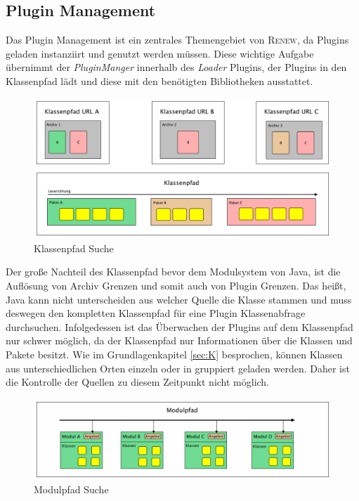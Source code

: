 	\subsection{Plugin Management} \label{sub:plugin_managment}
		Das Plugin Management ist ein zentrales Themengebiet von \textsc{Renew}, da Plugins geladen instanziirt und genutzt werden müssen. Diese wichtige Aufgabe übernimmt der \textit{PluginManger} innerhalb des \textit{Loader} Plugins, der Plugins in den Klassenpfad lädt und diese mit den benötigten Bibliotheken ausstattet.\bigbreak
		\begin{figure}[h!]
		  \centering
		  \includegraphics[width=\textwidth]{material/images/Klassenpfad.pdf}
		  \caption{Klassenpfad Suche}
		  \label{fig:CP_Struktur}
		\end{figure}
		Der große Nachteil des Klassenpfad bevor dem Modulsystem von Java, ist die Auflösung von Archiv Grenzen und somit auch von Plugin Grenzen. Das heißt, Java kann nicht unterscheiden aus welcher Quelle die Klasse stammen und muss deswegen den kompletten Klassenpfad für eine Plugin Klassenabfrage durchsuchen. Infolgedessen ist das Überwachen der Plugins auf dem Klassenpfad nur schwer möglich, da der Klassenpfad nur Informationen über die Klassen und Pakete besitzt. Wie im Grundlagenkapitel \ref{sec:K} besprochen, können Klassen aus unterschiedlichen Orten einzeln oder in gruppiert geladen werden. Daher ist die Kontrolle der Quellen zu diesem Zeitpunkt nicht möglich. \bigbreak
		\begin{figure}[h!]
		  \centering
		  \includegraphics[width=\textwidth]{material/images/Modulpfad.pdf}
		  \caption{Modulpfad Suche}
		  \label{fig:MP_Struktur}
		\end{figure}
